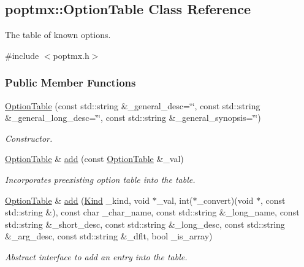 \hypertarget{classpoptmx_1_1OptionTable}{
\subsection{poptmx::OptionTable Class Reference}
\label{classpoptmx_1_1OptionTable}
}


The table of known options.  




{\ttfamily \#include $<$poptmx.h$>$}

\subsubsection*{Public Member Functions}
\begin{DoxyCompactItemize}
\item 
\hyperlink{classpoptmx_1_1OptionTable_a6076177bf680019cd40eefa652080bb5}{OptionTable} (const std::string \&\_\-general\_\-desc=\char`\"{}\char`\"{}, const std::string \&\_\-general\_\-long\_\-desc=\char`\"{}\char`\"{}, const std::string \&\_\-general\_\-synopsis=\char`\"{}\char`\"{})
\begin{DoxyCompactList}\small\item\em Constructor. \item\end{DoxyCompactList}\item 
\hyperlink{classpoptmx_1_1OptionTable}{OptionTable} \& \hyperlink{classpoptmx_1_1OptionTable_af084ab4547da12159b8ff7928e69a6c3}{add} (const \hyperlink{classpoptmx_1_1OptionTable}{OptionTable} \&\_\-val)
\begin{DoxyCompactList}\small\item\em Incorporates preexisting option table into the table. \item\end{DoxyCompactList}\item 
\hyperlink{classpoptmx_1_1OptionTable}{OptionTable} \& \hyperlink{classpoptmx_1_1OptionTable_a8625427dbbd7c64c8b3118f3d588486f}{add} (\hyperlink{group__poptmx_ga3f58821f631b466567d001183ca437e2}{Kind} \_\-kind, void $\ast$\_\-val, int($\ast$\_\-convert)(void $\ast$, const std::string \&), const char \_\-char\_\-name, const std::string \&\_\-long\_\-name, const std::string \&\_\-short\_\-desc, const std::string \&\_\-long\_\-desc, const std::string \&\_\-arg\_\-desc, const std::string \&\_\-dflt, bool \_\-is\_\-array)
\begin{DoxyCompactList}\small\item\em Abstract interface to add an entry into the table. \item\end{DoxyCompactList}\item 

\end{DoxyCompactItemize}
